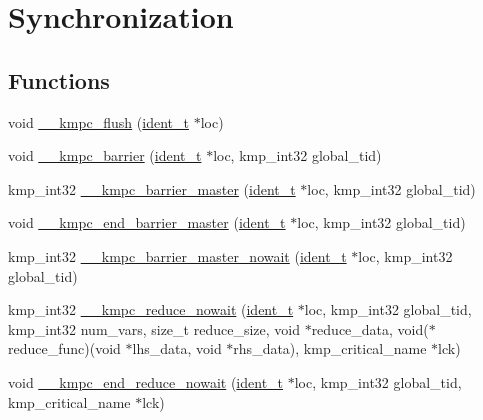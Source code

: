 \hypertarget{group__SYNCHRONIZATION}{\section{Synchronization}
\label{group__SYNCHRONIZATION}
}
\subsection*{Functions}
\begin{DoxyCompactItemize}
\item 
void \hyperlink{group__SYNCHRONIZATION_ga90f0e4bf417a06cff2a4f895daa4ff37}{\-\_\-\-\_\-kmpc\-\_\-flush} (\hyperlink{group__BASIC__TYPES_ga690fda6b92f039a72db263c6b4394ddb}{ident\-\_\-t} $\ast$loc)
\item 
void \hyperlink{group__SYNCHRONIZATION_ga84b2ebeef737395dddd8ef446c071760}{\-\_\-\-\_\-kmpc\-\_\-barrier} (\hyperlink{group__BASIC__TYPES_ga690fda6b92f039a72db263c6b4394ddb}{ident\-\_\-t} $\ast$loc, kmp\-\_\-int32 global\-\_\-tid)
\item 
kmp\-\_\-int32 \hyperlink{group__SYNCHRONIZATION_gacea2959cabb92c4a941087e524c5f3d5}{\-\_\-\-\_\-kmpc\-\_\-barrier\-\_\-master} (\hyperlink{group__BASIC__TYPES_ga690fda6b92f039a72db263c6b4394ddb}{ident\-\_\-t} $\ast$loc, kmp\-\_\-int32 global\-\_\-tid)
\item 
void \hyperlink{group__SYNCHRONIZATION_ga35415691dad1e3430caa78c9d4b34cb3}{\-\_\-\-\_\-kmpc\-\_\-end\-\_\-barrier\-\_\-master} (\hyperlink{group__BASIC__TYPES_ga690fda6b92f039a72db263c6b4394ddb}{ident\-\_\-t} $\ast$loc, kmp\-\_\-int32 global\-\_\-tid)
\item 
kmp\-\_\-int32 \hyperlink{group__SYNCHRONIZATION_ga5a51fa2c8f61d807895e377d6c732b16}{\-\_\-\-\_\-kmpc\-\_\-barrier\-\_\-master\-\_\-nowait} (\hyperlink{group__BASIC__TYPES_ga690fda6b92f039a72db263c6b4394ddb}{ident\-\_\-t} $\ast$loc, kmp\-\_\-int32 global\-\_\-tid)
\item 
kmp\-\_\-int32 \hyperlink{group__SYNCHRONIZATION_gafc5438d4c4f01dcd347d9bfde27f68e1}{\-\_\-\-\_\-kmpc\-\_\-reduce\-\_\-nowait} (\hyperlink{group__BASIC__TYPES_ga690fda6b92f039a72db263c6b4394ddb}{ident\-\_\-t} $\ast$loc, kmp\-\_\-int32 global\-\_\-tid, kmp\-\_\-int32 num\-\_\-vars, size\-\_\-t reduce\-\_\-size, void $\ast$reduce\-\_\-data, void($\ast$reduce\-\_\-func)(void $\ast$lhs\-\_\-data, void $\ast$rhs\-\_\-data), kmp\-\_\-critical\-\_\-name $\ast$lck)
\item 
void \hyperlink{group__SYNCHRONIZATION_ga5c40184c6babbe35c50d43a47573c5c5}{\-\_\-\-\_\-kmpc\-\_\-end\-\_\-reduce\-\_\-nowait} (\hyperlink{group__BASIC__TYPES_ga690fda6b92f039a72db263c6b4394ddb}{ident\-\_\-t} $\ast$loc, kmp\-\_\-int32 global\-\_\-tid, kmp\-\_\-critical\-\_\-name $\ast$lck)

\end{DoxyCompactItemize}

